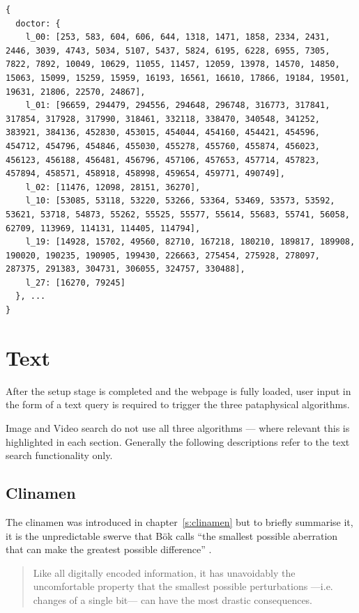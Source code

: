 \label{c:pos}
\begin{verbatim}
{
  doctor: {
    l_00: [253, 583, 604, 606, 644, 1318, 1471, 1858, 2334, 2431, 2446, 3039, 4743, 5034, 5107, 5437, 5824, 6195, 6228, 6955, 7305, 7822, 7892, 10049, 10629, 11055, 11457, 12059, 13978, 14570, 14850, 15063, 15099, 15259, 15959, 16193, 16561, 16610, 17866, 19184, 19501, 19631, 21806, 22570, 24867],
    l_01: [96659, 294479, 294556, 294648, 296748, 316773, 317841, 317854, 317928, 317990, 318461, 332118, 338470, 340548, 341252, 383921, 384136, 452830, 453015, 454044, 454160, 454421, 454596, 454712, 454796, 454846, 455030, 455278, 455760, 455874, 456023, 456123, 456188, 456481, 456796, 457106, 457653, 457714, 457823, 457894, 458571, 458918, 458998, 459654, 459771, 490749],
    l_02: [11476, 12098, 28151, 36270],
    l_10: [53085, 53118, 53220, 53266, 53364, 53469, 53573, 53592, 53621, 53718, 54873, 55262, 55525, 55577, 55614, 55683, 55741, 56058, 62709, 113969, 114131, 114405, 114794],
    l_19: [14928, 15702, 49560, 82710, 167218, 180210, 189817, 189908, 190020, 190235, 190905, 199430, 226663, 275454, 275928, 278097, 287375, 291383, 304731, 306055, 324757, 330488],
    l_27: [16270, 79245]
  }, ...
}
\end{verbatim}


\section{Text}
\label{s:algorithms}

After the setup stage is completed and the webpage is fully loaded, user input in the form of a text query is required to trigger the three pataphysical algorithms.

Image and Video search do not use all three algorithms --- where relevant this is highlighted in each section. Generally the following descriptions refer to the text search functionality only.


\subsection{Clinamen}
\label{s:clinamenimpl}

The clinamen was introduced in chapter~\ref{s:clinamen} but to briefly summarise it, it is the unpredictable swerve that Bök calls ``the smallest possible aberration that can make the greatest possible difference'' \citeyear{Boek2002}.

\begin{quotation}
  Like all digitally encoded information, it has unavoidably the uncomfortable property that the smallest possible perturbations —i.e. changes of a single bit— can have the most drastic consequences. 
\end{quotation}

